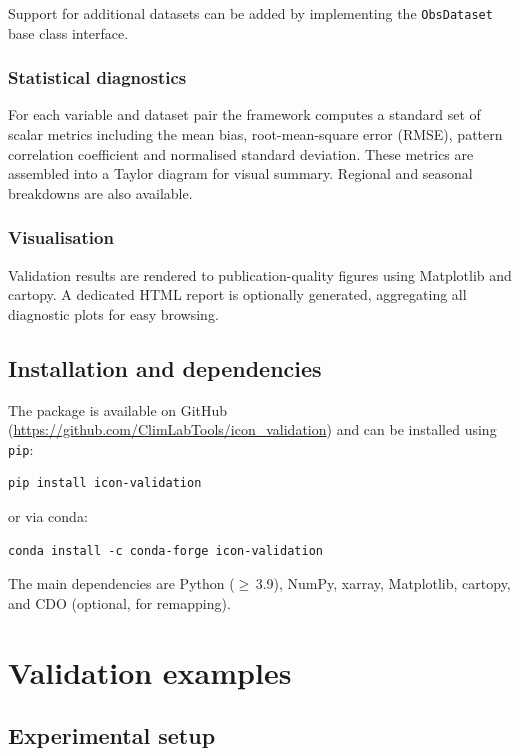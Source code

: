 \documentclass[gmd, manuscript]{copernicus}
\begin{document}
Support for additional datasets can be added by implementing the
\texttt{ObsDataset} base class interface.

\subsubsection{Statistical diagnostics}

For each variable and dataset pair the framework computes a standard set of
scalar metrics including the mean bias, root-mean-square error (RMSE),
pattern correlation coefficient and normalised standard deviation.
These metrics are assembled into a Taylor diagram \citep{taylor2001taylor}
for visual summary.
Regional and seasonal breakdowns are also available.

\subsubsection{Visualisation}

Validation results are rendered to publication-quality figures using
Matplotlib and cartopy.
A dedicated HTML report is optionally generated, aggregating all diagnostic
plots for easy browsing.

\subsection{Installation and dependencies}

The package is available on GitHub
(\url{https://github.com/ClimLabTools/icon_validation}) and can be
installed using \texttt{pip}:
\begin{verbatim}
pip install icon-validation
\end{verbatim}
or via conda:
\begin{verbatim}
conda install -c conda-forge icon-validation
\end{verbatim}

The main dependencies are Python ($\geq$\,3.9), NumPy, xarray, Matplotlib,
cartopy, and CDO (optional, for remapping).

\section{Validation examples}
\label{sec:validation}

\subsection{Experimental setup}
\end{document}
